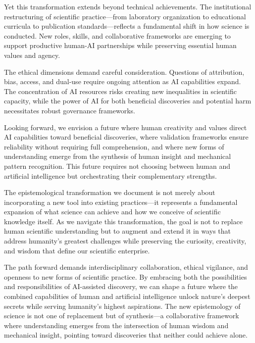 \documentclass{article}
\begin{document}
Yet this transformation extends beyond technical achievements. The institutional restructuring of scientific practice—from laboratory organization to educational curricula to publication standards—reflects a fundamental shift in how science is conducted. New roles, skills, and collaborative frameworks are emerging to support productive human-AI partnerships while preserving essential human values and agency.


The ethical dimensions demand careful consideration. Questions of attribution, bias, access, and dual-use require ongoing attention as AI capabilities expand. The concentration of AI resources risks creating new inequalities in scientific capacity, while the power of AI for both beneficial discoveries and potential harm necessitates robust governance frameworks.


Looking forward, we envision a future where human creativity and values direct AI capabilities toward beneficial discoveries, where validation frameworks ensure reliability without requiring full comprehension, and where new forms of understanding emerge from the synthesis of human insight and mechanical pattern recognition. This future requires not choosing between human and artificial intelligence but orchestrating their complementary strengths.


The epistemological transformation we document is not merely about incorporating a new tool into existing practices—it represents a fundamental expansion of what science can achieve and how we conceive of scientific knowledge itself. As we navigate this transformation, the goal is not to replace human scientific understanding but to augment and extend it in ways that address humanity's greatest challenges while preserving the curiosity, creativity, and wisdom that define our scientific enterprise.


The path forward demands interdisciplinary collaboration, ethical vigilance, and openness to new forms of scientific practice. By embracing both the possibilities and responsibilities of AI-assisted discovery, we can shape a future where the combined capabilities of human and artificial intelligence unlock nature's deepest secrets while serving humanity's highest aspirations. The new epistemology of science is not one of replacement but of synthesis—a collaborative framework where understanding emerges from the intersection of human wisdom and mechanical insight, pointing toward discoveries that neither could achieve alone.
\end{document}
